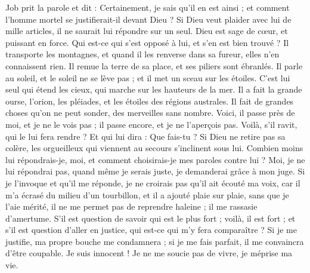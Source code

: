 \begin{multicols}{2}
\VerseOne{}Job prit la parole et dit :
Certainement, je sais qu'il en est ainsi ; et comment l'homme mortel se justifierait-il devant Dieu ?
Si Dieu veut plaider avec lui de mille articles, il ne saurait lui répondre sur un seul.
 Dieu est sage de cœur, et puissant en force. Qui est-ce qui s'est opposé à lui, et s'en est bien trouvé ?
Il transporte les montagnes, et quand il les renverse dans sa fureur, elles n'en connaissent rien.
Il remue la terre de sa place, et ses piliers sont ébranlés.
Il parle au soleil, et le soleil ne se lève pas ; et il met un sceau sur les étoiles.
 C'est lui seul qui étend les cieux, qui marche sur les hauteurs de la mer.
Il a fait la grande ourse, l'orion, les pléiades, et les étoiles des régions australes.
Il fait de grandes choses qu'on ne peut sonder, des merveilles sans nombre.
Voici, il passe près de moi, et je ne le vois pas ; il passe encore, et je ne l'aperçois pas.
Voilà, s'il ravit, qui le lui fera rendre ? Et qui lui dira : Que fais-tu ?
Si Dieu ne retire pas sa colère, les orgueilleux qui viennent au secours s'inclinent sous lui.
Combien moins lui répondrais-je, moi, et comment choisirais-je mes paroles contre lui ? 
Moi, je ne lui répondrai pas, quand même je serais juste, je demanderai grâce à mon juge.
Si je l'invoque et qu'il me réponde, je ne croirais pas qu'il ait écouté ma voix,
car il m'a écrasé du milieu d'un tourbillon, et il a ajouté plaie sur plaie, sans que je l'aie mérité, 
il ne me permet pas de reprendre haleine ; il me rassasie d'amertume.
S'il est question de savoir qui est le plus fort ; voilà, il est fort ; et s'il est question d'aller en justice, qui est-ce qui m'y fera comparaître ? 
Si je me justifie, ma propre bouche me condamnera ; si je me fais parfait, il me convaincra d'être coupable.
Je suis innocent ! Je ne me soucie pas de vivre, je méprise ma vie.

\end{multicols}
